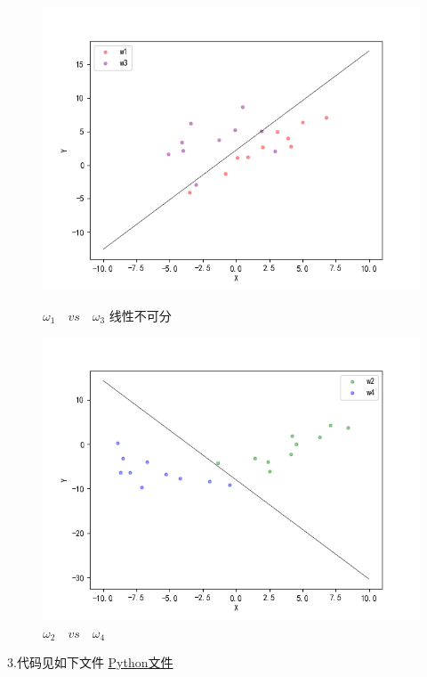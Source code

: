 \documentclass[a4paper,11pt,onecolumn,oneside,UTF8]{article}
\begin{document}
\begin{figure}[H]
    \begin{minipage}[t]{0.5\linewidth}
        \centering
        \includegraphics[width=\textwidth]{hw3_5.png}
        \caption{ $\omega_1 \quad vs\quad \omega_3$ 线性不可分 }
    \end{minipage}%
    \begin{minipage}[t]{0.5\linewidth}
        \centering
        \includegraphics[width=\textwidth]{hw3_6.png}
        \caption{ $\omega_2 \quad vs\quad \omega_4$ }
    \end{minipage}
\end{figure}

3.代码见如下文件
\href{https://github.com/Allenem/PatternRecognition/blob/main/hw3/hw3.py}{Python文件}
\end{document}

